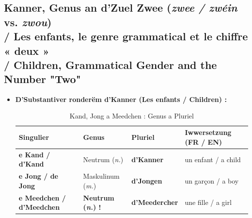 \subsection{Kanner, Genus an d'Zuel \flqq Zwee\frqq{} (\textit{zwee / zwéin} vs. \textit{zwou}) \\/ Les enfants, le genre grammatical et le chiffre « deux » \\/ Children, Grammatical Gender and the Number "Two"}

\begin{itemize}
    \item \textbf{D'Substantiver ronderëm d'Kanner (Les enfants / Children) :}
    \begin{table}[htbp]
        \centering
        \small
        \begin{tabular}{llll}
            \toprule
            \textbf{Singulier} & \textbf{Genus} & \textbf{Pluriel} & \textbf{Iwwersetzung (FR / EN)} \\
            \midrule
            \textbf{e Kand / d'Kand} & Neutrum (\textit{n.}) & \textbf{d'Kanner} & un enfant / a child \\
            \textbf{e Jong / de Jong} & Maskulinum (\textit{m.}) & \textbf{d'Jongen} & un garçon / a boy \\
            \textbf{e Meedchen / d'Meedchen} & \textbf{Neutrum (\textit{n.}) !} & \textbf{d'Meedercher} & une fille / a girl \\
            \bottomrule
        \end{tabular}
        \caption{Kand, Jong a Meedchen : Genus a Pluriel}
    \end{table}


\end{itemize}
